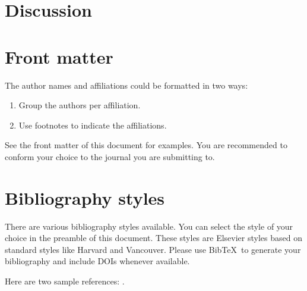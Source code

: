 \documentclass[review]{elsarticle}
\begin{document}
\section{Discussion}

\section{Front matter}

The author names and affiliations could be formatted in two ways:
\begin{enumerate}[(1)]
\item Group the authors per affiliation.
\item Use footnotes to indicate the affiliations.
\end{enumerate}
See the front matter of this document for examples. You are recommended to conform your choice to the journal you are submitting to.

\section{Bibliography styles}

There are various bibliography styles available. You can select the style of your choice in the preamble of this document. These styles are Elsevier styles based on standard styles like Harvard and Vancouver. Please use Bib\TeX\ to generate your bibliography and include DOIs whenever available.

Here are two sample references: \cite{Feynman1963118,Dirac1953888}.


\end{document}
